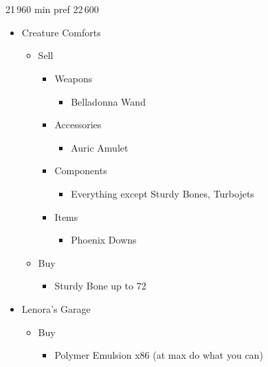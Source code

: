\chapter{}


\begin{shop}{21\,960 min pref 22\,600}
\begin{itemize}
    \item Creature Comforts
    \begin{itemize}
        \item Sell
        \begin{itemize}
            \item Weapons
            \begin{itemize}
                \item Belladonna Wand
            \end{itemize}
            \item Accessories
            \begin{itemize}
                \item Auric Amulet
            \end{itemize}
            \item Components
            \begin{itemize}
                \item Everything except Sturdy Bones, Turbojets
            \end{itemize}
            \item Items
            \begin{itemize}
                \item Phoenix Downs
            \end{itemize}
        \end{itemize}
        \item Buy
        \begin{itemize}
            \item Sturdy Bone up to 72
        \end{itemize}
    \end{itemize}
    \item Lenora's Garage
    \begin{itemize}
        \item Buy
        \begin{itemize}
            \item Polymer Emulsion x86 (at max do what you can)
        \end{itemize}
    \end{itemize}
\end{itemize}
\end{shop}

